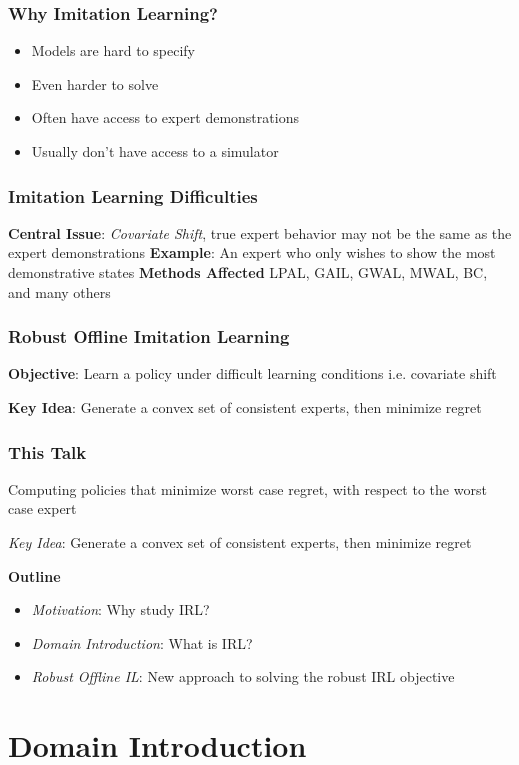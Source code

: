 \documentclass{beamer}
\begin{document}
\begin{frame}
\frametitle{Why Imitation Learning?}
	\begin{itemize}
		\item Models are hard to specify
		\item Even harder to solve
		\item Often have access to expert demonstrations
		\item Usually don't have access to a simulator
	\end{itemize}
\end{frame}

\begin{frame}
	\frametitle{Imitation Learning Difficulties}
	\textbf{Central Issue}: \emph{Covariate Shift}, true expert behavior may not be the same as the expert demonstrations
	\vfill
	\textbf{Example}: An expert who only wishes to show the most demonstrative states
	\vfill
	\textbf{Methods Affected} LPAL, GAIL, GWAL, MWAL, BC, and many others
\end{frame}

\begin{frame}
	\frametitle{Robust Offline Imitation Learning}
	\textbf{Objective}: Learn a policy under difficult learning conditions i.e. covariate shift

	\vfill

	\textbf{Key Idea}: Generate a convex set of consistent experts, then minimize regret
\end{frame}

\begin{frame}
	\frametitle{This Talk}
	Computing policies that minimize worst case regret, with respect to the worst case expert

	\vfill
	\emph{Key Idea}: Generate a convex set of consistent experts, then minimize regret

	\textbf{Outline}
	\begin{itemize}
	\item \emph{Motivation}: Why study IRL?
	\item \emph{Domain Introduction}: What is IRL?
	\item \emph{Robust Offline IL}: New approach to solving the robust IRL objective
	\end{itemize}
\end{frame}

\section*{Domain Introduction}
\end{document}
